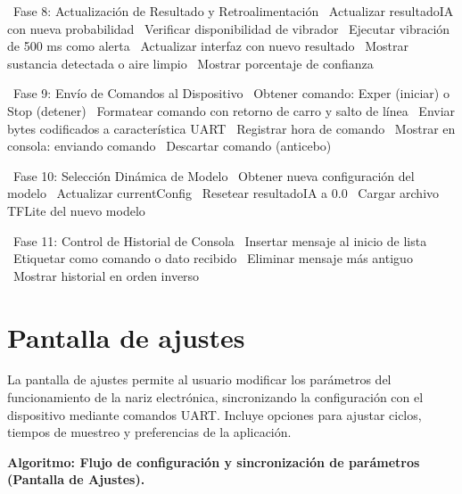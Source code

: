 \begin{algorithmic}[1]
\State~Fase 8: Actualización de Resultado y Retroalimentación
\State~Actualizar resultadoIA con nueva probabilidad
    \State~Verificar disponibilidad de vibrador
        \State~Ejecutar vibración de 500 ms como alerta
    \EndIf%
\EndIf%
\State~Actualizar interfaz con nuevo resultado
\State~Mostrar sustancia detectada o aire limpio
\State~Mostrar porcentaje de confianza

\State~Fase 9: Envío de Comandos al Dispositivo
    \State~Obtener comando: Exper (iniciar) o Stop (detener)
    \State~Formatear comando con retorno de carro y salto de línea
    \State~Enviar bytes codificados a característica UART
    \State~Registrar hora de comando
    \State~Mostrar en consola: enviando comando
\Else%
    \State~Descartar comando (anticebo)
\EndIf%

\State~Fase 10: Selección Dinámica de Modelo
    \State~Obtener nueva configuración del modelo
    \State~Actualizar currentConfig
    \State~Resetear resultadoIA a 0.0
    \State~Cargar archivo TFLite del nuevo modelo
\EndIf%

\State~Fase 11: Control de Historial de Consola
    \State~Insertar mensaje al inicio de lista
    \State~Etiquetar como comando o dato recibido
        \State~Eliminar mensaje más antiguo
    \EndIf%
\EndFor%
\State~Mostrar historial en orden inverso

\end{algorithmic}

\section{Pantalla de ajustes}

La pantalla de ajustes permite al usuario modificar los parámetros del funcionamiento de la nariz electrónica, sincronizando la configuración con el dispositivo mediante comandos UART\@. Incluye opciones para ajustar ciclos, tiempos de muestreo y preferencias de la aplicación.
\par

\noindent\textbf{Algoritmo: Flujo de configuración y sincronización de parámetros (Pantalla de Ajustes).}

